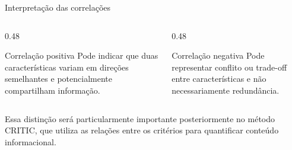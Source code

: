 \begin{frame}{Interpretação das correlações}

    \begin{columns}[T]

        \begin{column}{0.48\textwidth}

            \begin{block}{Correlação positiva}
                Pode indicar que duas características variam em
                direções semelhantes e potencialmente compartilham
                informação.
            \end{block}

        \end{column}


        \begin{column}{0.48\textwidth}

            \begin{block}{Correlação negativa}
                Pode representar conflito ou trade-off entre
                características e não necessariamente redundância.
            \end{block}

        \end{column}

    \end{columns}

    \vspace{0.5cm}

    Essa distinção será particularmente importante posteriormente no
    método CRITIC, que utiliza as relações entre os critérios para
    quantificar conteúdo informacional.

\end{frame}



